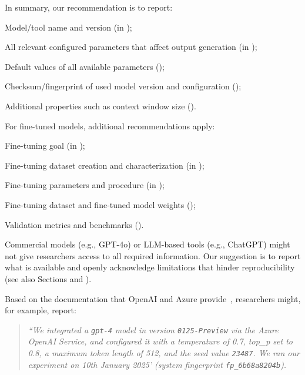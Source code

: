 In summary, our recommendation is to report:

\begin{enumerate*}[label=(\arabic*)]
\item Model/tool name and version (\must in \paper);
\item All relevant configured parameters that affect output generation (\must in \paper);
\item Default values of all available parameters (\should);
\item Checksum/fingerprint of used model version and configuration (\may);
\item Additional properties such as context window size (\may).
\end{enumerate*}

For fine-tuned models, additional recommendations apply:

\begin{enumerate*}[label=(\arabic*)]
\item Fine-tuning goal (\must in \paper);
\item Fine-tuning dataset creation and characterization (\must in \paper);
\item Fine-tuning parameters and procedure (\must in \paper);
\item Fine-tuning dataset and fine-tuned model weights (\should);
\item Validation metrics and benchmarks (\should).
\end{enumerate*}

Commercial models (e.g., GPT-4o) or LLM-based tools (e.g., ChatGPT) might not give researchers access to all required information.
Our suggestion is to report what is available and openly acknowledge limitations that hinder reproducibility (see also Sections \prompts and \limitationsmitigations).


Based on the documentation that OpenAI and Azure provide~\cite{OpenAI25, Azure25}, researchers might, for example, report:

\begin{quote}
\small
\it
 ``We integrated a  \texttt{gpt-4} model in version \texttt{0125-Preview} via the Azure OpenAI Service, and configured it with a temperature of 0.7, top\_p set to 0.8, a maximum token length of 512, and the  seed value \texttt{23487}.
 We ran our experiment on 10th January 2025' (system fingerprint \texttt{fp\_6b68a8204b}).
\end{quote}

